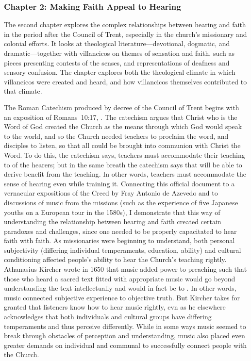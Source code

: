 \documentclass[tt]{vcbook-proposal}
\begin{document}
\subsubsection{Chapter 2: Making Faith Appeal to Hearing}

The second chapter explores the complex relationships between hearing and faith in the period after the Council of Trent, especially in the church's missionary and colonial efforts.
It looks at theological literature---devotional, dogmatic, and dramatic---together with villancicos on themes of sensation and faith, such as pieces presenting contests of the senses, and representations of deafness and sensory confusion.
The chapter explores both the theological climate in which villancicos were created and heard, and how villancicos themselves contributed to that climate.

The Roman Catechism produced by decree of the Council of Trent begins with an exposition of Romans~10:17, .
The catechism argues that Christ who is the Word of God created the Church as the means through which God would speak to the world, and so the Church needed teachers to proclaim the word, and disciples to listen, so that all could be brought into communion with Christ the Word.
To do this, the catechism says, teachers must accommodate their teaching to  of the hearers; but in the same breath the catechism says that  will be able to derive benefit from the teaching.
In other words, teachers must accommodate the sense of hearing even while training it.
Connecting this official document to a vernacular expositions of the Creed by Fray Antonio de Azevedo and to discussions of music from the missions (such as the experience of five Japanese youths on a European tour in the 1580s), I demonstrate that this way of understanding the relationship between hearing and faith created certain paradoxes and challenges, since one needed to be properly capacitated to hear faith with faith.
As missionaries were beginning to understand, both personal subjectivity (differing individual temperaments, education, ability) and cultural conditioning affected people's ability to hear the Church's teaching rightly.
Athanasius Kircher wrote in 1650 that music added power to preaching such that those who heard a sacred text fitted with appropriate music would go beyond understanding the text intellectually and would in fact be  to .
In other words, music connected subjective experience to objective truth. 
But Kircher takes for granted that listeners know how to hear music rightly, evn as he elsewhere acknowledges that both individuals and cultural groups have differing temperaments and thus perceive differently.
While in some ways music seemed to break through obstacles of perception and understanding, music also placed even greater demands on individual and communal  to successfully connect people with the Church.
\end{document}
